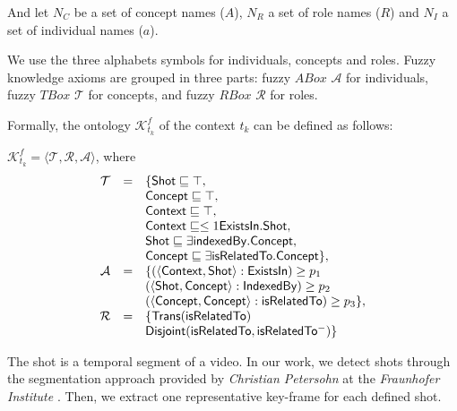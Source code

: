 		And let $N_{C}$ be a set of concept names ($A$), $N_{R}$ a set of role names ($R$) 	
		and $N_{I}$ a set of individual names ($a$). 

		We use the three alphabets symbols for individuals, concepts and roles. Fuzzy knowledge axioms 
		are grouped in three parts: fuzzy $ABox$ $\mathcal{A}$ for individuals, fuzzy $TBox$ 
		$\mathcal{T}$ for concepts, and fuzzy $RBox$ $\mathcal{R}$ for roles. 

		\begin{definition}
		Formally, the ontology $\mathcal{K}^{f}_{t_{k}}$ 
		of the context $t_{k}$	
		can be defined as follows: 

		$\mathcal{K}^{f}_{t_{k}} = \langle \mathcal{T}, \mathcal{R}, \mathcal{A} \rangle$, where
		{
			\begin{equation*}
			\begin{array}{ c c l }
			\mathcal{T}  	& = 	& \{\mathsf{Shot} \sqsubseteq \top,\\
			&	& \mathsf{Concept} \sqsubseteq \top,\\
			&	& \mathsf{Context} \sqsubseteq \top,\\
			&	& \mathsf{Context}\sqsubseteq\leq{}1\mathsf{ExistsIn.Shot},\\
			&	& \mathsf{Shot}\sqsubseteq\exists\mathsf{indexedBy.Concept},\\
			&	& \mathsf{Concept} \sqsubseteq \exists{}\mathsf{isRelatedTo.Concept}\},\\
			\mathcal{A}	& = 	&
			\{(\langle{}\mathsf{Context},\mathsf{Shot}\rangle:\mathsf{ExistsIn})\geq
			p_{1}\\
			&	& (\langle{}\mathsf{Shot},\mathsf{Concept}\rangle:\mathsf{IndexedBy}) \geq	p_{2}\\
			&	& (\langle{}\mathsf{Concept},\mathsf{Concept}\rangle:\mathsf{isRelatedTo})
			\geq p_{3}\},\\
			\mathcal{R} 	& =	& \{\mathsf{Trans(isRelatedTo)} \\
			&	& \mathsf{Disjoint(isRelatedTo,isRelatedTo^{-})}\}
			\end{array}
		\end{equation*}
		}
		\end{definition}
		
		
		The shot is a temporal segment of a video. In our work, we detect
		shots through the segmentation approach provided by \emph{Christian Petersohn} 
		at the \emph{Fraunhofer Institute} \cite{Petersohn2004}. 
		Then, we extract one representative key-frame for each defined shot.
		

